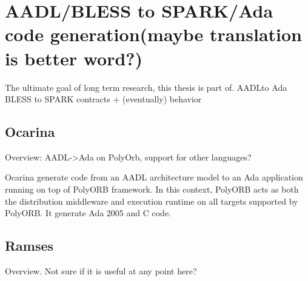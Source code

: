 \section{AADL/BLESS to SPARK/Ada code generation(maybe translation is better word?)}
\label{background:codegen}
The ultimate goal of long term research, this thesis is part of.
AADLto Ada
BLESS to SPARK contracts + (eventually) behavior

\subsection{Ocarina}
\label{background:codegen:ocarina}
Overview: AADL->Ada on PolyOrb, support for other languages?

Ocarina generate code from an AADL architecture model to an Ada application running on top of PolyORB framework. In this context, PolyORB acts as both the distribution middleware and execution runtime on all targets supported by PolyORB.
It generate Ada 2005 and C code.


\subsection{Ramses}
\label{background:codegen:ramses}
Overview. Not sure if it is useful at any point here?